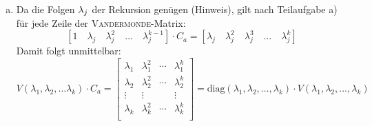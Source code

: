 \begin{enumerate}[(a)]
\item
	Da die Folgen ${\bf \lambda}_j$ der Rekursion genügen (Hinweis), gilt nach Teilaufgabe a) für jede Zeile der \textsc{Vandermonde}-Matrix:
	\[ \left[ 1 \quad \lambda_j \quad \lambda_j^2 \quad \ldots \quad \lambda_j^{k-1} \right] \cdot C_a =
	   \left[ \lambda_j \quad \lambda_j^2 \quad \lambda_j^3 \quad \ldots \quad \lambda_j^k\right] \]
	Damit folgt unmittelbar:
	\[ V(\lambda_1, \lambda_2, \ldots \lambda_k) \cdot C_a = 
		\begin{bmatrix}
			\lambda_1 & \lambda_1^2 & \cdots & \lambda_1^k \\
			\lambda_2 & \lambda_2^2 & \cdots & \lambda_2^k \\
			\vdots    & \vdots      &        & \vdots      \\
			\lambda_k & \lambda_k^2 & \cdots & \lambda_k^k \\
		\end{bmatrix} = \text{diag}(\lambda_1, \lambda_2, \ldots, \lambda_k) \cdot V(\lambda_1, \lambda_2, ..., \lambda_k) \]
\end{enumerate}
